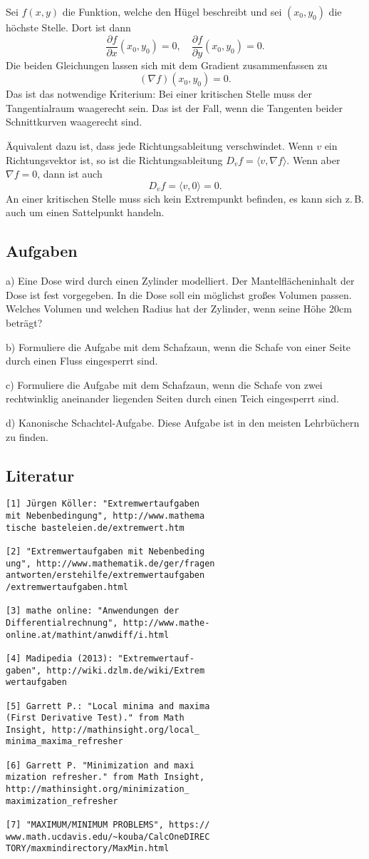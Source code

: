 \documentclass[a4paper,11pt,fleqn,twocolumn,twoside,dvipdfmx]{scrartcl}
\begin{document}
Sei $f(x,y)$ die Funktion, welche den Hügel beschreibt und sei
$(x_0,y_0)$ die höchste Stelle. Dort ist dann
\[\frac{\partial f}{\partial x}(x_0,y_0)=0,\quad
\frac{\partial f}{\partial y}(x_0,y_0)=0.\]
Die beiden Gleichungen lassen sich mit dem Gradient zusammenfassen
zu
\[(\nabla f)(x_0,y_0)=0.\]
Das ist das notwendige Kriterium: Bei einer kritischen Stelle
muss der Tangentialraum waagerecht sein. Das ist der Fall, wenn
die Tangenten beider Schnittkurven waagerecht sind.

Äquivalent dazu ist, dass jede Richtungsableitung verschwindet.
Wenn $v$ ein Richtungsvektor ist, so ist die Richtungsableitung
$D_v f = \langle v,\nabla f\rangle$. Wenn aber $\nabla f=0$,
dann ist auch
\[D_v f = \langle v,0\rangle = 0.\]
An einer kritischen Stelle muss sich kein Extrempunkt befinden,
es kann sich z.\,B. auch um einen Sattelpunkt handeln.

\subsection*{Aufgaben}

a) Eine Dose wird durch einen Zylinder modelliert.
Der Mantelflächeninhalt der Dose ist fest vorgegeben.
In die Dose soll ein möglichst großes Volumen passen.
Welches Volumen und welchen Radius hat der Zylinder, wenn seine
Höhe 20cm beträgt?

b) Formuliere die Aufgabe mit dem Schafzaun, wenn die Schafe von
einer Seite durch einen Fluss eingesperrt sind.

c) Formuliere die Aufgabe mit dem Schafzaun, wenn die Schafe
von zwei rechtwinklig aneinander liegenden Seiten durch einen
Teich eingesperrt sind.

d) Kanonische Schachtel-Aufgabe. Diese Aufgabe ist in den meisten
Lehrbüchern zu finden.

\subsection*{Literatur}

\begin{verbatim}
[1] Jürgen Köller: "Extremwertaufgaben
mit Nebenbedingung", http://www.mathema
tische basteleien.de/extremwert.htm

[2] "Extremwertaufgaben mit Nebenbeding
ung", http://www.mathematik.de/ger/fragen
antworten/erstehilfe/extremwertaufgaben
/extremwertaufgaben.html

[3] mathe online: "Anwendungen der
Differentialrechnung", http://www.mathe-
online.at/mathint/anwdiff/i.html

[4] Madipedia (2013): "Extremwertauf-
gaben", http://wiki.dzlm.de/wiki/Extrem
wertaufgaben

[5] Garrett P.: "Local minima and maxima
(First Derivative Test)." from Math
Insight, http://mathinsight.org/local_
minima_maxima_refresher

[6] Garrett P. "Minimization and maxi
mization refresher." from Math Insight,
http://mathinsight.org/minimization_
maximization_refresher

[7] "MAXIMUM/MINIMUM PROBLEMS", https://
www.math.ucdavis.edu/~kouba/CalcOneDIREC
TORY/maxmindirectory/MaxMin.html
\end{verbatim}
\end{document}
